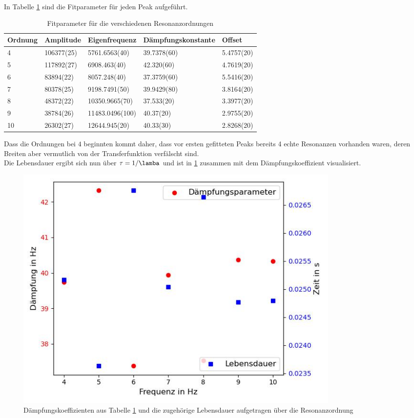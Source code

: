 \documentclass[../main.tex]{subfiles}
\begin{document}
       In Tabelle \ref{tab:I_f_LorentzParameter} sind die Fitparameter für jeden Peak aufgeführt.

       \begin{table}[H]
        \centering
        \begin{tabular}{l|l|l|l|l}
            \textbf{Ordnung} & \textbf{Amplitude} & \textbf{Eigenfrequenz} & \textbf{Dämpfungskonstante} & \textbf{Offset}\\
            \hline
            4 & 106377(25) & 5761.6563(40) & 39.7378(60) & 5.4757(20)\\
            \hline
            5 & 117892(27) & 6908.463(40) & 42.320(60) & 4.7619(20)\\
            \hline
            6 & 83894(22) & 8057.248(40) & 37.3759(60) & 5.5416(20)\\
            \hline
            7 & 80378(25) & 9198.7491(50) & 39.9429(80) & 3.8164(20)\\
            \hline
            8 & 48372(22) & 10350.9665(70) & 37.533(20) & 3.3977(20)\\
            \hline
            9 & 38784(26) & 11483.0496(100) & 40.37(20) & 2.9755(20)\\
            \hline
            10 & 26302(27) & 12644.945(20) & 40.33(30) & 2.8268(20)
        \end{tabular}
        \caption{Fitparameter für die verschiedenen Resonanzordnungen}
        \label{tab:I_f_LorentzParameter}
    \end{table}
    
    Dass die Ordnungen bei $4$ beginnten kommt daher, dass vor ersten gefitteten Peaks bereits 4 echte Resonanzen vorhanden waren, deren Breiten aber vermutlich von der Transferfunktion verfälscht sind.\\
    
    Die Lebensdauer ergibt sich nun über $\tau=1/\lamba$ und ist in \ref{fig:I_f_Lebensdauer} zusammen mit dem Dämpfungskoeffizient visualisiert.

    \begin{figure}[H]
        \centering
        \includegraphics[width=0.8\textwidth]{Bilddateien/Auswertung/I_f_Lebensdauer.jpg}
        \caption{Dämpfungskoeffizienten aus Tabelle \ref{tab:I_f_LorentzParameter} und die zugehörige Lebensdauer aufgetragen über die Resonanzordnung}
        \label{fig:I_f_Lebensdauer}
    \end{figure}
\end{document}
